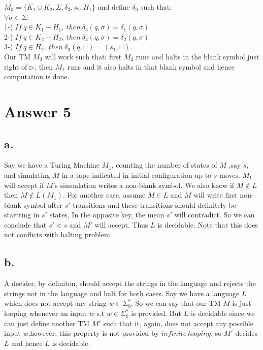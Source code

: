 \documentclass[12pt]{article}
\begin{document}
$M_3 = \{K_1 \cup K_2, \Sigma, \delta_3, s_2, H_1 \}$ and define $\delta_3$ such that:\\

$\forall \sigma \in \Sigma$:\\
1-) $If\ q \in K_1 - H_1,\ then\ \delta_3(q, \sigma) = \delta_1(q, \sigma)$\\
2-) $If\ q \in K_2 - H_2,\ then\ \delta_3(q, \sigma) = \delta_2(q, \sigma)$\\
3-) $If\ q \in H_2,\ then\ \delta_3(q, \sqcup) = (s_1, \sqcup)$.\\

Our TM $M_3$ will work such that: first $M_2$ runs and halts in the blank symbol just 
right of $\triangleright$, then $M_1$ runs and it also halts in that blank symbol and 
hence computation is done.

\section*{Answer 5}

\subsection*{a.}

Say we have a Turing Machine $M_1$, counting the number of states of $M$ ,say $s$, and 
simulating $M$ in a tape indicated in initial configuration up to $s$ moves. $M_1$ will
accept if $M$'s simualation writes a non-blank symbol. We also know if $M \notin L$ then
$M \notin L(M_1)$. For another case, assume $M \in L$ and $M$ will write first non-blank
symbol after $s'$ transitions and these transitions should definitely be startting in 
$s'$ states, In the opposite key, the mean $s'$ will contradict. So we can conclude that
$s' < s$ and $M'$ will accept. Thus $L$ is decidable. Note that this does not conflicts
with halting problem.

\subsection*{b.}

A decider, by definiton, should accept the strings in the language and rejects the 
strings not in the language and halt for both cases. Say we have a language $L$ which 
does not accept any string $w \in \Sigma_0^*$. So we can say that our TM $M$ is just 
looping whenever an input $w$ s.t $w \in \Sigma_0^*$ is provided. But $L$ is decidable 
since we can just define another TM $M'$ such that it, again, does not accept any 
possible input $w$,however, this property is not provided by $infinite\ looping$, so 
$M'$ decides $L$ and hence $L$ is decidable.
\end{document}
